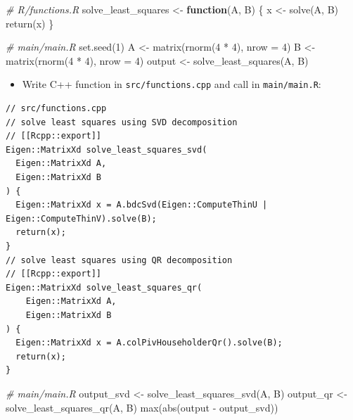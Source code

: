 \documentclass[
]{book}
\newenvironment{Shaded}{\begin{snugshade}}{\end{snugshade}}
\newcommand{\AttributeTok}[1]{\textcolor[rgb]{0.77,0.63,0.00}{#1}}
\newcommand{\CommentTok}[1]{\textcolor[rgb]{0.56,0.35,0.01}{\textit{#1}}}
\newcommand{\ControlFlowTok}[1]{\textcolor[rgb]{0.13,0.29,0.53}{\textbf{#1}}}
\newcommand{\DecValTok}[1]{\textcolor[rgb]{0.00,0.00,0.81}{#1}}
\newcommand{\FunctionTok}[1]{\textcolor[rgb]{0.00,0.00,0.00}{#1}}
\newcommand{\NormalTok}[1]{#1}
\newcommand{\OtherTok}[1]{\textcolor[rgb]{0.56,0.35,0.01}{#1}}
\newcommand{\SpecialCharTok}[1]{\textcolor[rgb]{0.00,0.00,0.00}{#1}}
\providecommand{\tightlist}{%
  \setlength{\itemsep}{0pt}\setlength{\parskip}{0pt}}
\begin{document}
\begin{Shaded}
\begin{Highlighting}[]
\CommentTok{\# R/functions.R}
\NormalTok{solve\_least\_squares }\OtherTok{\textless{}{-}}
  \ControlFlowTok{function}\NormalTok{(A, B) \{}
\NormalTok{    x }\OtherTok{\textless{}{-}} \FunctionTok{solve}\NormalTok{(A, B)}
    \FunctionTok{return}\NormalTok{(x)}
\NormalTok{  \}}
\end{Highlighting}
\end{Shaded}

\begin{Shaded}
\begin{Highlighting}[]
\CommentTok{\# main/main.R}
\FunctionTok{set.seed}\NormalTok{(}\DecValTok{1}\NormalTok{)}
\NormalTok{A }\OtherTok{\textless{}{-}} \FunctionTok{matrix}\NormalTok{(}\FunctionTok{rnorm}\NormalTok{(}\DecValTok{4} \SpecialCharTok{*} \DecValTok{4}\NormalTok{), }\AttributeTok{nrow =} \DecValTok{4}\NormalTok{)}
\NormalTok{B }\OtherTok{\textless{}{-}} \FunctionTok{matrix}\NormalTok{(}\FunctionTok{rnorm}\NormalTok{(}\DecValTok{4} \SpecialCharTok{*} \DecValTok{4}\NormalTok{), }\AttributeTok{nrow =} \DecValTok{4}\NormalTok{)}
\NormalTok{output }\OtherTok{\textless{}{-}} \FunctionTok{solve\_least\_squares}\NormalTok{(A, B)}
\end{Highlighting}
\end{Shaded}

\begin{itemize}
\tightlist
\item
  Write C++ function in \texttt{src/functions.cpp} and call in \texttt{main/main.R}:
\end{itemize}

\begin{verbatim}
// src/functions.cpp
// solve least squares using SVD decomposition
// [[Rcpp::export]]
Eigen::MatrixXd solve_least_squares_svd(
  Eigen::MatrixXd A,
  Eigen::MatrixXd B
) {
  Eigen::MatrixXd x = A.bdcSvd(Eigen::ComputeThinU | Eigen::ComputeThinV).solve(B);
  return(x);
}
// solve least squares using QR decomposition
// [[Rcpp::export]]
Eigen::MatrixXd solve_least_squares_qr(
    Eigen::MatrixXd A,
    Eigen::MatrixXd B
) {
  Eigen::MatrixXd x = A.colPivHouseholderQr().solve(B);
  return(x);
}
\end{verbatim}

\begin{Shaded}
\begin{Highlighting}[]
\CommentTok{\# main/main.R}
\NormalTok{output\_svd }\OtherTok{\textless{}{-}} \FunctionTok{solve\_least\_squares\_svd}\NormalTok{(A, B)}
\NormalTok{output\_qr }\OtherTok{\textless{}{-}} \FunctionTok{solve\_least\_squares\_qr}\NormalTok{(A, B)}
\FunctionTok{max}\NormalTok{(}\FunctionTok{abs}\NormalTok{(output }\SpecialCharTok{{-}}\NormalTok{ output\_svd))}
\end{Highlighting}
\end{Shaded}
\end{document}
